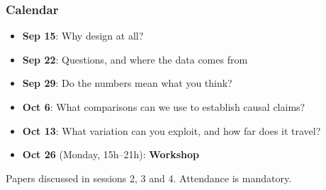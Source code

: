 \begin{frame}
\frametitle{Calendar}
\centering

\small
\begin{itemize}
  \item \textbf{Sep 15}: Why design at all?
  \item \textbf{Sep 22}: Questions, and where the data comes from
  \item \textbf{Sep 29}: Do the numbers mean what you think?
  \item \textbf{Oct 6}: What comparisons can we use to establish causal claims?
  \item \textbf{Oct 13}: What variation can you exploit, and how far does it travel?
  \vspace{8pt}
  \item \textbf{Oct 26} (Monday, 15h--21h): \textbf{Workshop}
\end{itemize}

\vspace{10pt}
\begin{flushleft}
\footnotesize Papers discussed in sessions 2, 3 and 4. Attendance is mandatory.
\end{flushleft}

\end{frame}

